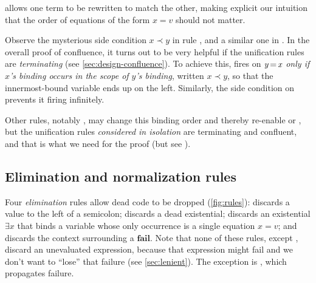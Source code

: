 \documentclass[acmsmall]{acmart}
\newcommand{\Varid}[1]{\mathit{#1}}
\newcommand{\simon}[1]{{\color{dkblue} [{SLPJ}: #1]}}
\newcommand{\lennart}[1]{{\color{dkcyan} [{LA}: #1]}}
\newcommand{\simon}[1]{}
\newcommand{\lennart}[1]{}
\begin{document}
 allows one term to be rewritten to match the other, making explicit
our intuition that the order of equations of the form \ensuremath{\Varid{x}\mathrel{=}\Varid{v}} should not matter.

Observe the mysterious side condition $\ensuremath{\Varid{x}} \prec \ensuremath{\Varid{y}}$  in rule ,
and a similar one in %
.
In the overall proof of confluence, it turns out to
be very helpful if the unification rules
are \emph{terminating} (see \cref{sec:design-confluence}).
To achieve this,  fires on \ensuremath{\Varid{y}\hspace{-0.14em}=\hspace{-0.14em}\Varid{x}} \emph{only if
\ensuremath{\Varid{x}}'s binding occurs in the scope of \ensuremath{\Varid{y}}'s binding}, written $\ensuremath{\Varid{x}} \prec \ensuremath{\Varid{y}}$, so that the innermost-bound variable
ends up on the left.
Similarly, the side condition on  prevents it firing infinitely.

Other rules, notably , may change this binding order
and thereby re-enable  or ,
but the unification rules \emph{considered in isolation} are terminating and confluent,
and that is what we need for the proof (but see ).

\subsection{Elimination and normalization rules} \label{sec:gc} \label{sec:normalization}


Four \emph{elimination} rules allow dead code to be dropped (\cref{fig:rules}):
 discards a value to the left of a semicolon;  discards
a dead existential;  discards an existential $\ensuremath{\exists{}} \ensuremath{\Varid{x}}$ that binds a variable whose only
occurrence is a single equation \ensuremath{\Varid{x}\mathrel{=}\Varid{v}}; and  discards the context surrounding a \ensuremath{\textbf{fail}}.
Note that none of these rules, except , discard an unevaluated expression,
because that expression might fail and we don't want to ``lose'' that failure (see \cref{sec:lenient}).
The exception is , which propagates failure.
\end{document}

